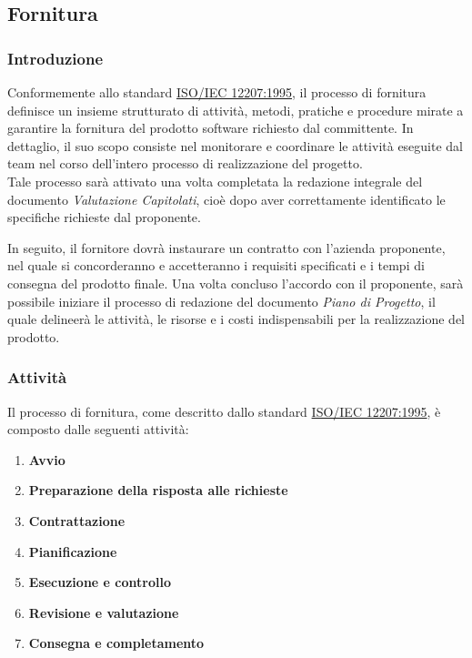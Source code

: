 \subsection{Fornitura}
\subsubsection{Introduzione}
Conformemente allo standard \href{https://www.math.unipd.it/~tullio/IS-1/2009/Approfondimenti/ISO_12207-1995.pdf}{ISO/IEC 12207:1995}, il processo di fornitura definisce un insieme strutturato di attività, metodi, pratiche e procedure mirate a garantire la fornitura del prodotto software richiesto dal committente. 
In dettaglio, il suo scopo consiste nel monitorare e coordinare le attività eseguite dal team nel corso dell'intero processo di realizzazione del progetto.\\
Tale processo sarà attivato una volta completata la redazione integrale del documento \textit{Valutazione Capitolati}, cioè dopo aver correttamente identificato le specifiche richieste dal proponente.

In seguito, il fornitore dovrà instaurare un contratto con l'azienda proponente, nel quale si concorderanno e accetteranno i requisiti specificati e i tempi di consegna del prodotto finale. Una volta concluso l'accordo con il proponente, sarà possibile iniziare il processo di redazione del documento
\textit{Piano di Progetto}, il quale delineerà le attività, le risorse e i costi indispensabili per la realizzazione del prodotto.

\subsubsection{Attività}
Il processo di fornitura, come descritto dallo standard \href{https://www.math.unipd.it/~tullio/IS-1/2009/Approfondimenti/ISO_12207-1995.pdf}{ISO/IEC 12207:1995}, è composto dalle seguenti attività:
\begin{enumerate}
    \item \textbf{Avvio}
    \item \textbf{Preparazione della risposta alle richieste}
    \item \textbf{Contrattazione}
    \item \textbf{Pianificazione}
    \item \textbf{Esecuzione e controllo}
    \item \textbf{Revisione e valutazione}
    \item \textbf{Consegna e completamento}
\end{enumerate}

